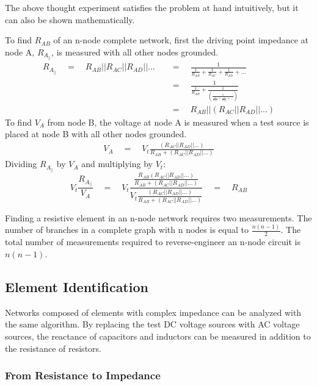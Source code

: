 \documentclass[11pt,twoside]{mitthesis}
\begin{document}
The above thought experiment satisfies the problem at hand intuitively, but it can also be shown mathematically.

To find $R_{AB}$ of an n-node complete network, first the driving point impedance at node A, $R_{A_{||}}$, is measured with all other nodes grounded.
\begin{align*}
R_{A_{||}} 
\quad = \quad R_{AB}||R_{AC}||R_{AD}||... 
\quad &= \quad \frac{1}{\frac{1}{R_{AB}}+\frac{1}{R_{AC}}+\frac{1}{R_{AD}}+...}\\
\quad &= \quad \frac{1}{\frac{1}{R_{AB}}+\frac{1}
{(\frac{1}{\frac{1}{R_{AC}}+\frac{1}{R_{AD}}+...})}}\\
\quad &= \quad R_{AB}||(R_{AC}||R_{AD}||...)
\end{align*}
To find $V_A$ from node B, the voltage at node A is measured when a test source is placed at node B with all other nodes grounded.
\begin{align*}
V_A
\quad = \quad V_t \frac{(R_{AC}||R_{AD}||...)}{R_{AB}+(R_{AC}||R_{AD}||...)}
\end{align*}
Dividing $R_{A_{||}}$ by $V_A$ and multiplying by $V_t$:
\begin{equation*}
V_t \frac{R_{A_{||}}}{V_A}
\quad = \quad V_t \frac{\frac{R_{AB}(R_{AC}||R_{AD}||...)}{R_{AB}+(R_{AC}||R_{AD}||...)}}
	{V_t \frac{(R_{AC}||R_{AD}||...)}{R_{AB}+(R_{AC}||R_{AD}||...)}}
\quad = \quad R_{AB} 
\end{equation*}

Finding a resistive element in an n-node network requires two measurements. 
The number of branches in a complete graph with n nodes is equal to $\frac{n(n-1)}{2}$.
The total number of measurements required to reverse-engineer an n-node circuit is $n(n-1)$.



\subsection{Element Identification}

Networks composed of elements with complex impedance can be analyzed with the same algorithm.
By replacing the test DC voltage sources with AC voltage sources, the reactance of capacitors and inductors can be measured in addition to the resistance of resistors.


\ifdefined\DEBUG
\subsubsection{From Resistance to Impedance}
\end{document}
